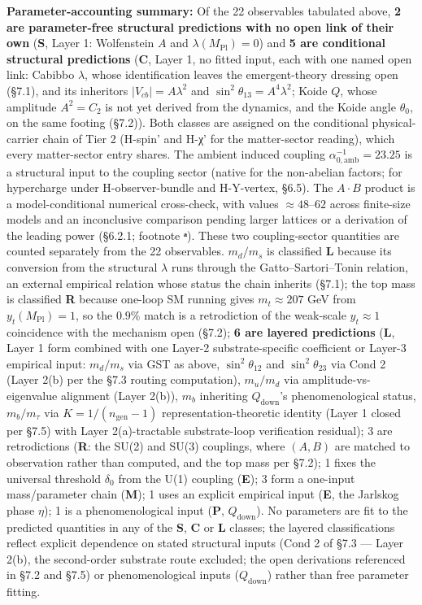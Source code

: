 \documentclass[
]{article}
\begin{document}
\textbf{Parameter-accounting summary:} Of the 22 observables tabulated
above, \textbf{2 are parameter-free structural predictions with no open
link of their own} (\textbf{S}, Layer 1: Wolfenstein \(A\) and
\(\lambda(M_{\text{Pl}}) = 0\)) and \textbf{5 are conditional structural
predictions} (\textbf{C}, Layer 1, no fitted input, each with one named
open link: Cabibbo \(\lambda\), whose identification leaves the
emergent-theory dressing open (§7.1), and its inheritors
\(|V_{cb}| = A\lambda^2\) and \(\sin^2\theta_{13} = A^4\lambda^2\);
Koide \(Q\), whose amplitude \(A^2 = C_2\) is not yet derived from the
dynamics, and the Koide angle \(\theta_0\), on the same footing (§7.2)).
Both classes are assigned on the conditional physical-carrier chain of
Tier 2 (H-spin' and H-χ' for the matter-sector reading), which every
matter-sector entry shares. The ambient induced coupling
\(\alpha^{-1}_{0,\mathrm{amb}} = 23.25\) is a structural input to the
coupling sector (native for the non-abelian factors; for hypercharge
under H-observer-bundle and H-Y-vertex, §6.5). The \(A \cdot B\) product
is a model-conditional numerical cross-check, with values
\(\approx 48\)--\(62\) across finite-size models and an inconclusive
comparison pending larger lattices or a derivation of the leading power
(§6.2.1; footnote \textbf{ᵃ}). These two coupling-sector quantities are
counted separately from the 22 observables. \(m_d/m_s\) is classified
\textbf{L} because its conversion from the structural \(\lambda\) runs
through the Gatto--Sartori--Tonin relation, an external empirical
relation whose status the chain inherits (§7.1); the top mass is
classified \textbf{R} because one-loop SM running gives
\(m_t \approx 207\) GeV from \(y_t(M_{\text{Pl}}) = 1\), so the
\(0.9\%\) match is a retrodiction of the weak-scale \(y_t \approx 1\)
coincidence with the mechanism open (§7.2); \textbf{6 are layered
predictions} (\textbf{L}, Layer 1 form combined with one Layer-2
substrate-specific coefficient or Layer-3 empirical input: \(m_d/m_s\)
via GST as above, \(\sin^2\theta_{12}\) and \(\sin^2\theta_{23}\) via
Cond 2 (Layer 2(b) per the §7.3 routing computation), \(m_u/m_d\) via
amplitude-vs-eigenvalue alignment (Layer 2(b)), \(m_b\) inheriting
\(Q_{\text{down}}\)'s phenomenological status, \(m_b/m_\tau\) via
\(K = 1/(n_{\text{gen}} - 1)\) representation-theoretic identity (Layer
1 closed per §7.5) with Layer 2(a)-tractable substrate-loop verification
residual); 3 are retrodictions (\textbf{R}: the SU(2) and SU(3)
couplings, where \((A, B)\) are matched to observation rather than
computed, and the top mass per §7.2); 1 fixes the universal threshold
\(\delta_0\) from the U(1) coupling (\textbf{E}); 3 form a one-input
mass/parameter chain (\textbf{M}); 1 uses an explicit empirical input
(\textbf{E}, the Jarlskog phase \(\eta\)); 1 is a phenomenological input
(\textbf{P}, \(Q_{\text{down}}\)). No parameters are fit to the
predicted quantities in any of the \textbf{S}, \textbf{C} or \textbf{L}
classes; the layered classifications reflect explicit dependence on
stated structural inputs (Cond 2 of §7.3 --- Layer 2(b), the
second-order substrate route excluded; the open derivations referenced
in §7.2 and §7.5) or phenomenological inputs (\(Q_\text{down}\)) rather
than free parameter fitting.
\end{document}

